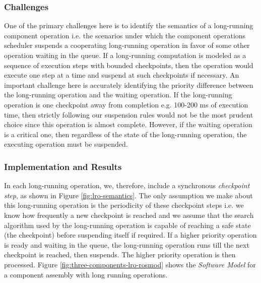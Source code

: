 \subsubsection{Challenges}

One of the primary challenges here is to identify the semantics of a long-running component operation i.e. the scenarios under which the component operations scheduler suspends a cooperating long-running operation in favor of some other operation waiting in the queue. If a long-running computation is modeled as a sequence of execution steps with bounded checkpoints, then the operation would execute one step at a time and suspend at such checkpoints if necessary. An important challenge here is accurately identifying the priority difference between the long-running operation and the waiting operation. If the long-running operation is one checkpoint away from completion e.g. 100-200 ms of execution time, then strictly following our suspension rules would not be the most prudent choice since this operation is almost complete. However, if the waiting operation is a critical one, then regardless of the state of the long-running operation, the executing operation must be suspended.

\subsubsection{Implementation and Results}

In each long-running operation, we, therefore, include a synchronous \emph{checkpoint step}, as shown in Figure \ref{fig:lro-semantics}. The only assumption we make about this long-running operation is the periodicity of these checkpoint steps i.e. we know how frequently a new checkpoint is reached and we assume that the search algorithm used by the long-running operation is capable of reaching a safe state (the checkpoint) before suspending itself if required. If a higher priority operation is ready and waiting in the queue, the long-running operation runs till the next checkpoint is reached, then suspends. The higher priority operation is then processed. Figure \ref{fig:three-components-lro-rosmod} shows the \emph{Software Model} for a component assembly with long running operations.

